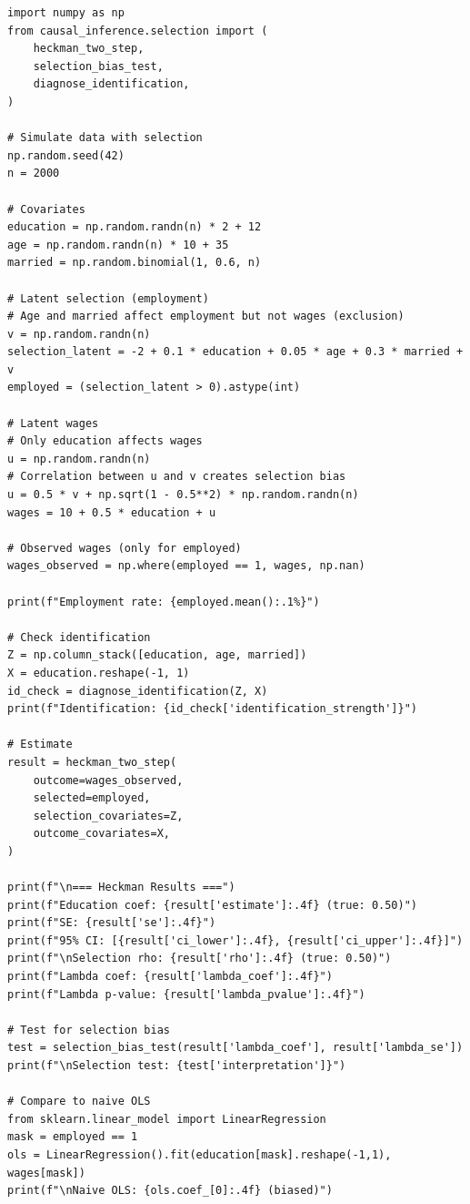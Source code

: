 \begin{verbatim}
import numpy as np
from causal_inference.selection import (
    heckman_two_step,
    selection_bias_test,
    diagnose_identification,
)

# Simulate data with selection
np.random.seed(42)
n = 2000

# Covariates
education = np.random.randn(n) * 2 + 12
age = np.random.randn(n) * 10 + 35
married = np.random.binomial(1, 0.6, n)

# Latent selection (employment)
# Age and married affect employment but not wages (exclusion)
v = np.random.randn(n)
selection_latent = -2 + 0.1 * education + 0.05 * age + 0.3 * married + v
employed = (selection_latent > 0).astype(int)

# Latent wages
# Only education affects wages
u = np.random.randn(n)
# Correlation between u and v creates selection bias
u = 0.5 * v + np.sqrt(1 - 0.5**2) * np.random.randn(n)
wages = 10 + 0.5 * education + u

# Observed wages (only for employed)
wages_observed = np.where(employed == 1, wages, np.nan)

print(f"Employment rate: {employed.mean():.1%}")

# Check identification
Z = np.column_stack([education, age, married])
X = education.reshape(-1, 1)
id_check = diagnose_identification(Z, X)
print(f"Identification: {id_check['identification_strength']}")

# Estimate
result = heckman_two_step(
    outcome=wages_observed,
    selected=employed,
    selection_covariates=Z,
    outcome_covariates=X,
)

print(f"\n=== Heckman Results ===")
print(f"Education coef: {result['estimate']:.4f} (true: 0.50)")
print(f"SE: {result['se']:.4f}")
print(f"95% CI: [{result['ci_lower']:.4f}, {result['ci_upper']:.4f}]")
print(f"\nSelection rho: {result['rho']:.4f} (true: 0.50)")
print(f"Lambda coef: {result['lambda_coef']:.4f}")
print(f"Lambda p-value: {result['lambda_pvalue']:.4f}")

# Test for selection bias
test = selection_bias_test(result['lambda_coef'], result['lambda_se'])
print(f"\nSelection test: {test['interpretation']}")

# Compare to naive OLS
from sklearn.linear_model import LinearRegression
mask = employed == 1
ols = LinearRegression().fit(education[mask].reshape(-1,1), wages[mask])
print(f"\nNaive OLS: {ols.coef_[0]:.4f} (biased)")
\end{verbatim}


